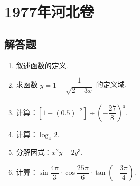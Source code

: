 \chapter{1977年河北卷}

\section{解答题}

\begin{problem}
\begin{enumerate}
    \item 叙述函数的定义.
    \item 求函数 \(y=1-\dfrac{1}{\sqrt{2-3x}}\) 的定义域.
    \item 计算：\(\left[1-\left(0.5\right)^{-2}\right]\div\left(-\dfrac{27}{8}\right)^{\frac{1}{3}}\).
    \item 计算：\(\log_{4}2\).
    \item 分解因式：\(x^2y-2y^3\).
    \item 计算：\(\sin\dfrac{4\pi}{3}\cdot\cos\dfrac{25\pi}{6}\cdot\tan\left(-\dfrac{3\pi}{4}\right)\).
\end{enumerate}
\end{problem}

